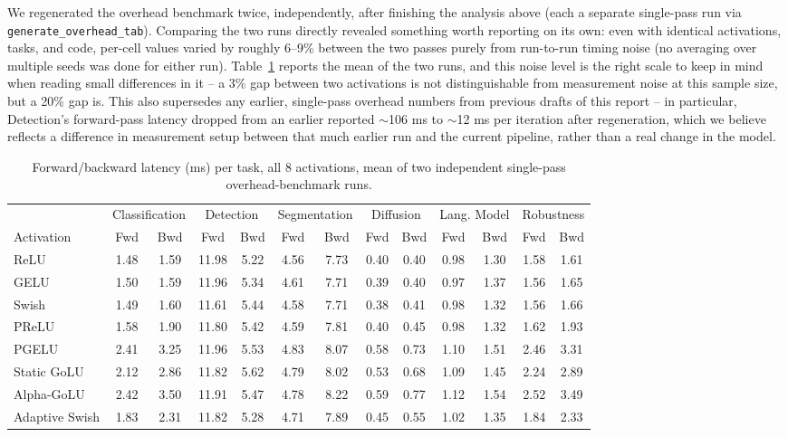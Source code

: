 \documentclass[conference]{IEEEtran}
\begin{document}
We regenerated the overhead benchmark twice, independently, after finishing the analysis above (each a separate single-pass run via \texttt{generate\_overhead\_tab}). Comparing the two runs directly revealed something worth reporting on its own: even with identical activations, tasks, and code, per-cell values varied by roughly 6--9\% between the two passes purely from run-to-run timing noise (no averaging over multiple seeds was done for either run). Table~\ref{tab:overhead_full} reports the mean of the two runs, and this noise level is the right scale to keep in mind when reading small differences in it -- a 3\% gap between two activations is not distinguishable from measurement noise at this sample size, but a 20\% gap is. This also supersedes any earlier, single-pass overhead numbers from previous drafts of this report -- in particular, Detection's forward-pass latency dropped from an earlier reported $\sim$106 ms to $\sim$12 ms per iteration after regeneration, which we believe reflects a difference in measurement setup between that much earlier run and the current pipeline, rather than a real change in the model.

\begin{table}[t]
\centering
\scriptsize
\setlength{\tabcolsep}{3pt}
\caption{Forward/backward latency (ms) per task, all 8 activations, mean of two independent single-pass overhead-benchmark runs.}
\label{tab:overhead_full}
\begin{tabular}{l cc cc cc cc cc cc}
\toprule
& \multicolumn{2}{c}{Classification} & \multicolumn{2}{c}{Detection} & \multicolumn{2}{c}{Segmentation} & \multicolumn{2}{c}{Diffusion} & \multicolumn{2}{c}{Lang. Model} & \multicolumn{2}{c}{Robustness} \\
Activation & Fwd & Bwd & Fwd & Bwd & Fwd & Bwd & Fwd & Bwd & Fwd & Bwd & Fwd & Bwd \\
\midrule
ReLU & 1.48 & 1.59 & 11.98 & 5.22 & 4.56 & 7.73 & 0.40 & 0.40 & 0.98 & 1.30 & 1.58 & 1.61 \\
GELU & 1.50 & 1.59 & 11.96 & 5.34 & 4.61 & 7.71 & 0.39 & 0.40 & 0.97 & 1.37 & 1.56 & 1.65 \\
Swish & 1.49 & 1.60 & 11.61 & 5.44 & 4.58 & 7.71 & 0.38 & 0.41 & 0.98 & 1.32 & 1.56 & 1.66 \\
PReLU & 1.58 & 1.90 & 11.80 & 5.42 & 4.59 & 7.81 & 0.40 & 0.45 & 0.98 & 1.32 & 1.62 & 1.93 \\
PGELU & 2.41 & 3.25 & 11.96 & 5.53 & 4.83 & 8.07 & 0.58 & 0.73 & 1.10 & 1.51 & 2.46 & 3.31 \\
Static GoLU & 2.12 & 2.86 & 11.82 & 5.62 & 4.79 & 8.02 & 0.53 & 0.68 & 1.09 & 1.45 & 2.24 & 2.89 \\
Alpha-GoLU & 2.42 & 3.50 & 11.91 & 5.47 & 4.78 & 8.22 & 0.59 & 0.77 & 1.12 & 1.54 & 2.52 & 3.49 \\
Adaptive Swish & 1.83 & 2.31 & 11.82 & 5.28 & 4.71 & 7.89 & 0.45 & 0.55 & 1.02 & 1.35 & 1.84 & 2.33 \\
\bottomrule
\end{tabular}
\end{table}
\end{document}
